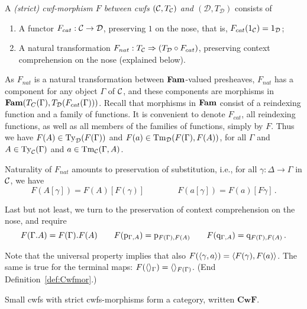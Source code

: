 \documentclass{lmcs}
\def\D{\mathcal{D}}
\def\Cwf{\mathbf{CwF}}
\begin{document}
\begin{definition}\label{def:Cwfmor}  
A \emph{(strict) cwf-morphism $F$ between cwfs $({\mathcal C},T_{\mathcal C})$ and $(\D,T_\D)$}
consists of

\begin{enumerate}

\item A functor $F_{cat} : \C \to \D$, preserving $1$ on the nose,
that is, $F_{cat}(1_{\C}) = 1_{\D}$;

\item A natural transformation $F_{nat} : T_\C \Rightarrow (T_\D \circ F_{cat})$,
preserving context comprehension on the nose (explained below).

\end{enumerate}
 
As $F_{nat}$ is a natural transformation between $\textbf{Fam}$-valued presheaves,
$F_{nat}$ has a component for any object $\Gamma$ of ${\mathcal C}$, and
these components are morphisms in $\Fam(T_C(\Gamma),T_\D(F_{cat}(\Gamma)))$.
Recall that morphisms in $\textbf{Fam}$ consist of a reindexing function
and a family of functions. It is convenient to denote $F_{cat}$,
all reindexing functions, as well as all members of the families of functions,
simply by $F$. Thus we have $F(A) \in \Ty_\D(F(\Gamma))$ 
and $F(a) \in \Tm_\D(F(\Gamma), F(A))$, for all $\Gamma$
and $A\in\mathrm{Ty}_{\mathcal C}(\Gamma)$ and $a\in \mathrm{Tm}_{\mathcal C}(\Gamma, A)$.

Naturality of $F_{nat}$
amounts to preservation of substitution, {i.e.}, for all 
$\gamma : \Delta \to \Gamma$ in ${\mathcal C}$, we have
\[
F(A[\gamma]) = F(A)[F(\gamma)] \qquad \qquad 
F(a[\gamma]) = F(a)[F\gamma]\,.
\]

Last but not least, we turn to the preservation of context comprehension
on the nose, and require
\[ 
F(\Gamma. A) = F(\Gamma). F(A) \qquad
F(\mathrm{p}_{\Gamma, A}) = \mathrm{p}_{F(\Gamma), F(A)} \qquad
F(\mathrm{q}_{\Gamma, A}) = \mathrm{q}_{F(\Gamma), F(A)}\,.
\]

Note that the universal property implies that also
$F(\langle \gamma,a \rangle) = \langle F(\gamma),F(a) \rangle$.
The same is true for the terminal maps:
$F(\langle  \rangle_\Gamma) = \langle  \rangle_{F(\Gamma)}$.
(End Definition~\ref{def:Cwfmor}.)
\end{definition}

Small cwfs with strict cwfs-morphisms form a category, written $\Cwf$. 
\end{document}
